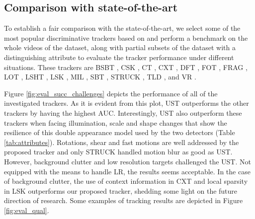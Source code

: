 \documentclass[conference,twoside]{IEEEtran}
\begin{document}
\subsection{Comparison with state-of-the-art}
To establish a fair comparison with the state-of-the-art, we select some of the most popular discriminative trackers based on \cite{wu2015object} and perform a benchmark on the whole videos of the dataset, along with partial subsets of the dataset with a distinguishing attribute to evaluate the tracker performance under different situations. These trackers are BSBT \cite{stalder2009beyond}, CSK \cite{henriques2012exploiting}, CT \cite{zhang2012real}, CXT \cite{dinh2011context}, 
DFT \cite{sevilla2012distribution}, FOT \cite{matas2011robustifying}, FRAG \cite{adam2006robust}, LOT \cite{oron2015locally}, LSHT \cite{he2013visual}, LSK \cite{liu2011robust}, MIL \cite{babenko2009visual}, SBT \cite{grabner2010tracking}, STRUCK \cite{hare2011struck}, TLD \cite{kalal2012tracking}, and VR \cite{collins2005online}. %

Figure \ref{fig:eval_succ_challenges} depicts the performance of all of the investigated trackers. As it is evident from this plot, UST outperforms the other trackers by having the highest AUC. Interestingly, UST also outperform these trackers when facing illumination, scale and shape changes that show the resilience of this double appearance model used by the two detectors (Table \ref{tab:attributes}). Rotations, shear and fast motions are well addressed by the proposed tracker and only STRUCK handled motion blur as good as UST. However, background clutter and low resolution targets challenged the UST. Not equipped with the means to handle LR, the results seems acceptable. In the case of background clutter, the use of context information in CXT and local sparsity in LSK outperforms our proposed tracker, shedding some light on the future direction of research. Some examples of tracking results are depicted in Figure \ref{fig:eval_qual}.
\end{document}
